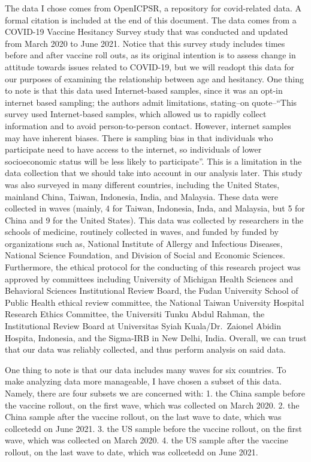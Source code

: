\documentclass[
]{article}
\begin{document}
The data I chose comes from OpenICPSR, a repository for covid-related
data. A formal citation is included at the end of this document. The
data comes from a COVID-19 Vaccine Hesitancy Survey study that was
conducted and updated from March 2020 to June 2021. Notice that this
survey study includes times before and after vaccine roll outs, as its
original intention is to assess change in attitude towards issues
related to COVID-19, but we will readopt this data for our purposes of
examining the relationship between age and hesitancy. One thing to note
is that this data used Internet-based samples, since it was an opt-in
internet based sampling; the authors admit limitations, stating--on
quote--``This survey used Internet-based samples, which allowed us to
rapidly collect information and to avoid person-to-person contact.
However, internet samples may have inherent biases. There is sampling
bias in that individuals who participate need to have access to the
internet, so individuals of lower socioeconomic status will be less
likely to participate''. This is a limitation in the data collection
that we should take into account in our analysis later. This study was
also surveyed in many different countries, including the United States,
mainland China, Taiwan, Indonesia, India, and Malaysia. These data were
collected in waves (mainly, 4 for Taiwan, Indonesia, Inda, and Malaysia,
but 5 for China and 9 for the United States). This data was collected by
researchers in the schools of medicine, routinely collected in waves,
and funded by funded by organizations such as, National Institute of
Allergy and Infectious Diseases, National Science Foundation, and
Division of Social and Economic Sciences. Furthermore, the ethical
protocol for the conducting of this research project was approved by
committees including University of Michigan Health Sciences and
Behavioral Sciences Institutional Review Board, the Fudan University
School of Public Health ethical review committee, the National Taiwan
University Hospital Research Ethics Committee, the Universiti Tunku
Abdul Rahman, the Institutional Review Board at Universitas Syiah
Kuala/Dr.~Zaionel Abidin Hospita, Indonesia, and the Sigma-IRB in New
Delhi, India. Overall, we can trust that our data was reliably
collected, and thus perform analysis on said data.

One thing to note is that our data includes many waves for six
countries. To make analyzing data more manageable, I have chosen a
subset of this data. Namely, there are four subsets we are concerned
with: 1. the China sample before the vaccine rollout, on the first wave,
which was collected on March 2020. 2. the China sample after the vaccine
rollout, on the last wave to date, which was collcetedd on June 2021. 3.
the US sample before the vaccine rollout, on the first wave, which was
collected on March 2020. 4. the US sample after the vaccine rollout, on
the last wave to date, which was collcetedd on June 2021.
\end{document}
